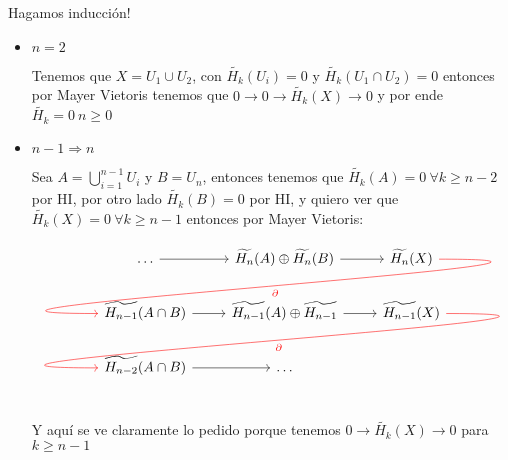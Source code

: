\documentclass[11pt,a4paper,oneside]{article}
\newenvironment{proof}[1][Demostraci\'on]{\begin{trivlist}
\item[\hskip \labelsep {\bfseries #1}]}{\end{trivlist}}
\newcommand{\qed}{\nobreak \ifvmode \relax \else
      \ifdim\lastskip<1.5em \hskip-\lastskip
      \hskip1.5em plus0em minus0.5em \fi \nobreak
      \vrule height0.75em width0.5em depth0.25em\fi}
\begin{document}
\begin{enumerate}
\begin{proof}

Hagamos inducci\'on!

\begin{itemize}

\item {$n = 2$}

Tenemos que $X = U_1 \cup U_2$, con $\widetilde{H_k}(U_i) = 0$ y $\widetilde{H_k}(U_1 \cap U_2) = 0$ entonces por Mayer Vietoris tenemos que $0 \rightarrow 0 \rightarrow \widetilde{H_k}(X) \rightarrow 0$ y por ende $\widetilde{H_k} = 0 \ n \geq 0$

\item {$n-1 \Longrightarrow n$}

Sea $A = \bigcup_{i=1}^{n-1} U_i$ y $B = U_{n}$, entonces tenemos que $\widetilde{H_k}(A) = 0 \ \forall k \geq n-2$ por HI, por otro lado $\widetilde{H_k}(B) = 0$ por HI, y quiero ver que $\widetilde{H_k}(X) = 0 \ \forall k \geq n-1$ entonces por Mayer Vietoris:

\[
\begin{tikzcd}
\dots \rar & \widetilde{H_{n}}(A) \oplus \widetilde{H_{n}}(B) \rar & \widetilde{H_{n}}(X) \arrow[out=0, in=180, looseness=2, overlay, red]{dll}{\partial} \\
\widetilde{H_{n-1}}(A \cap B) \rar & \widetilde{H_{n-1}}(A) \oplus \widetilde{H_{n-1}} \rar & \widetilde{H_{n-1}}(X) \arrow[out=0, in=180, looseness=2, overlay, red]{dll}{\partial} \\
\widetilde{H_{n-2}}(A \cap B) \rar & \dots \\
\end{tikzcd}
\]

Y aqu\'i se ve claramente lo pedido porque tenemos $0 \rightarrow \widetilde{H_{k}}(X) \rightarrow 0$ para $k \geq n-1$ \qed

\end{itemize}

\end{proof}


\end{enumerate}
\end{document}
